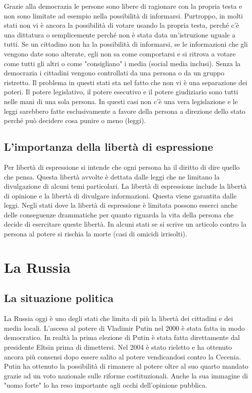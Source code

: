 \documentclass[a4paper, 12pt]{article}
\begin{document}
Grazie alla democrazia le persone sono libere di ragionare con la propria testa e non sono limitate ad esempio nella possibilità di informarsi. Purtroppo, in molti stati non vi è ancora la possibilità di votare usando la propria testa, perché c'è una dittatura o semplicemente perché non è stata data un'istruzione uguale a tutti. Se un cittadino non ha la possibilità di informarsi, se le informazioni che gli vengono date sono alterate, egli non sa come comportarsi e si ritrova a votare come tutti gli altri o come "consigliano" i media (social media inclusi). Senza la democrazia i cittadini vengono controllati da una persona o da un gruppo ristretto. Il problema in questi stati sta nel fatto che non vi è una separazione dei poteri. Il potere legislativo, il potere esecutivo e il potere giudiziario sono tutti nelle mani di una sola persona. In questi casi non c'è una vera legislazione e le leggi sarebbero fatte esclusivamente a favore della persona a direzione dello stato perché può decidere cosa punire o meno (leggi).

\subsection{L'importanza della libertà di espressione}

Per libertà di espressione si intende che ogni persona ha il diritto di dire quello che pensa. Questa libertà avvolte è dettata dalle leggi che ne limitano la divulgazione di alcuni temi particolari. La libertà di espressione include la libertà di opinione e la libertà di divulgare informazioni. Questa viene garantita dalle leggi. Negli stati dove la libertà di espressione è limitata possono esserci anche delle conseguenze drammatiche per quanto riguarda la vita della persona che decide di esercitare queste libertà. In alcuni stati se si scrive un articolo contro la persona al potere si rischia la morte (casi di omicidi irrisolti).

\section{La Russia}

\subsection{La situazione politica}

La Russia oggi è uno degli stati che limita di più la libertà dei cittadini e dei media locali. L'ascesa al potere di Vladimir Putin nel 2000 è stata fatta in modo democratico. In realtà la prima elezione di Putin è stata fatta direttamente dal presidente Eltsin prima di dimettersi. Nel 2004 è stato rieletto e ha ottenuto ancora più consensi dopo essere salito al potere vendicandosi contro la Cecenia. Putin ha ottenuto la possibilità di rimanere al potere oltre al suo quarto mandato grazie ad un voto nazionale sulle riforme costituzionali. Anche la sua immagine di "uomo forte" lo ha reso importante agli occhi dell'opinione pubblica.
\end{document}
